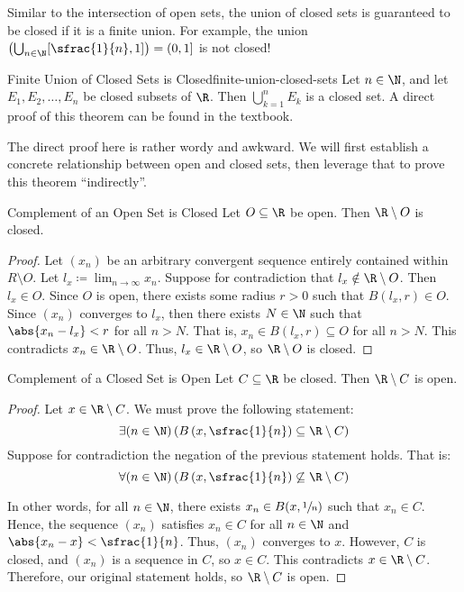 Similar to the intersection of open sets, the union of closed sets is guaranteed to be closed if it is a finite union. For example, the union $\left( \bigcup_{n \in \N} [\sfrac{1}{n}, 1]\right) = (0,1]$ is not closed!

\begin{thmbox}{Finite Union of Closed Sets is Closed}{finite-union-closed-sets}
    Let $n \in \N$, and let $E_1, E_2, \ldots, E_n$ be closed subsets of $\R$. Then $\bigcup_{k=1}^n E_k$ is a closed set.
    \tcblower
    A direct proof of this theorem can be found in the textbook.
\end{thmbox}

The direct proof here is rather wordy and awkward. We will first establish a concrete relationship between open and closed sets, then leverage that to prove this theorem ``indirectly''.

\begin{thmbox}{Complement of an Open Set is Closed}{}
    Let $O \subseteq \R$ be open. Then $\R \setminus O$ is closed.
    \tcblower
    \begin{proof}
        Let $(x_n)$ be an arbitrary convergent sequence entirely contained within $R \setminus O$. Let $l_x \coloneq \lim_{n\to\infty} x_n$. Suppose for contradiction that $l_x \notin \R \setminus O$. Then $l_x \in O$. Since $O$ is open, there exists some radius $r > 0$ such that $B(l_x, r) \in O$. Since $(x_n)$ converges to $l_x$, then there exists $N \in \N$ such that $\abs{x_n - l_x} < r$ for all $n > N$. That is, $x_n \in B(l_x, r) \subseteq O$ for all $n > N$. This contradicts $x_n \in \R \setminus O$. Thus, $l_x \in \R \setminus O$, so $\R \setminus O$ is closed.
    \end{proof}
\end{thmbox}

\begin{thmbox}{Complement of a Closed Set is Open}{}
    Let $C \subseteq \R$ be closed. Then $\R \setminus C$ is open.
    \tcblower
    \begin{proof}
        Let $x \in \R \setminus C$. We must prove the following statement:
        \[ \exists (n \in \N) \left( B \left(x, \sfrac{1}{n} \right) \subseteq \R \setminus C \right) \]
        Suppose for contradiction the negation of the previous statement holds. That is:
        \[ \forall (n \in \N) \left( B \left(x, \sfrac{1}{n} \right) \not \subseteq \R \setminus C \right) \]

        In other words, for all $n \in \N$, there exists $x_n \in B(x, \sfrac{1}{n})$ such that $x_n \in C$. Hence, the sequence $(x_n)$ satisfies $x_n \in C$ for all $n \in \N$ and $\abs{x_n - x} < \sfrac{1}{n}$. Thus, $(x_n)$ converges to $x$. However, $C$ is closed, and $(x_n)$ is a sequence in $C$, so $x \in C$. This contradicts $x \in \R \setminus C$. Therefore, our original statement holds, so $\R \setminus C$ is open.
    \end{proof}
\end{thmbox}

